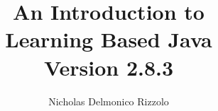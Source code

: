 \documentclass[11pt]{book}
\begin{document}
\title{
  \LARGE{An Introduction to}\\
  \Huge{Learning Based Java}\\
  \vspace{.3cm}
  \Large{Version 2.8.3}}
\author{Nicholas Delmonico Rizzolo}
\maketitle
\frontmatter
\tableofcontents
\mainmatter












\end{document}

